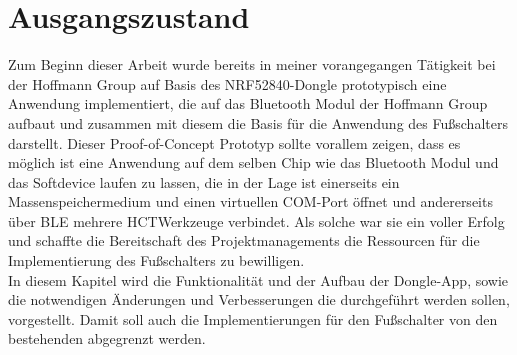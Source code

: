 \section{Ausgangszustand}
Zum Beginn dieser Arbeit wurde bereits in meiner vorangegangen Tätigkeit bei der Hoffmann Group auf Basis des NRF52840-Dongle prototypisch eine Anwendung implementiert, die auf das Bluetooth Modul der Hoffmann Group aufbaut und zusammen mit diesem die Basis für die Anwendung des Fußschalters darstellt. Dieser Proof-of-Concept Prototyp sollte vorallem zeigen, dass es möglich ist eine Anwendung auf dem selben Chip wie das Bluetooth Modul und das Softdevice laufen zu lassen, die in der Lage ist einerseits ein Massenspeichermedium und einen virtuellen COM-Port öffnet und andererseits über \ac{BLE} mehrere \ac{HCT}Werkzeuge verbindet. Als solche war sie ein voller Erfolg und schaffte die Bereitschaft des Projektmanagements die Ressourcen für die Implementierung des Fußschalters zu bewilligen.\\
In diesem Kapitel wird die Funktionalität und der Aufbau der Dongle-App, sowie die notwendigen Änderungen und Verbesserungen die durchgeführt werden sollen, vorgestellt. Damit soll auch die Implementierungen für den Fußschalter von den bestehenden abgegrenzt werden.

